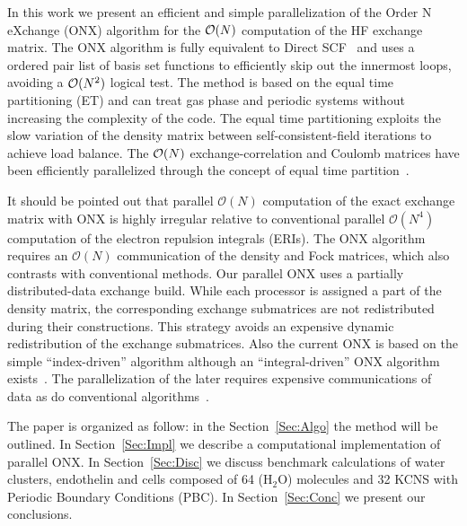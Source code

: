 \documentclass[prl,twocolumn,twocolumngrid,superbib]{revtex4} %
\begin{document}
 In this work we present an efficient and simple parallelization
 of the Order N eXchange (ONX) algorithm for the ${\cal O}(N)$ computation 
 of the HF exchange matrix. The ONX algorithm is fully equivalent to Direct SCF~\cite{Amlof82}
 and uses a ordered pair list of basis set functions to efficiently skip out the innermost loops,
 avoiding a ${\cal O}(N^2)$ logical test.
 The method is based on the equal time partitioning (ET) and can treat gas phase and periodic systems 
 without increasing the complexity of the code. The equal time partitioning exploits 
 the slow variation of the density matrix between self-consistent-field iterations
 to achieve load balance. The ${\cal O}(N)$ exchange-correlation and Coulomb matrices
 have been efficiently parallelized through the concept of equal time
 partition~\cite{CGan03,CGan04B}.

 It should be pointed out that parallel $\mathcal{O}(N)$ computation
 of the exact exchange matrix with ONX is highly irregular relative 
 to conventional parallel $\mathcal{O}(N^4)$ computation of the electron repulsion integrals (ERIs).
 The ONX algorithm requires an $\mathcal{O}(N)$ communication of the 
 density and Fock matrices, which also contrasts with conventional methods.
 Our parallel ONX uses a partially distributed-data exchange build. While each processor 
 is assigned a part of the density matrix, the corresponding exchange submatrices are not redistributed during
 their constructions. This strategy avoids an expensive dynamic redistribution 
 of the exchange submatrices. 
 Also the current ONX is based on the simple ``index-driven'' algorithm although
 an ``integral-driven'' ONX algorithm exists~\cite{ESchwegler00}.
 The parallelization of the later requires expensive communications of data
 as do conventional algorithms~\cite{HTakashima02}.


 The paper is organized as follow: in the Section~\ref{Sec:Algo} the method
 will be outlined.
 In Section~\ref{Sec:Impl} we describe a computational implementation 
 of parallel ONX. In Section~\ref{Sec:Disc} we discuss benchmark calculations of 
 water clusters, endothelin and cells composed of 64
 (H$_2$O) molecules and 32 KCNS with Periodic Boundary Conditions (PBC).    
 In Section~\ref{Sec:Conc} we present our conclusions.


\end{document}
